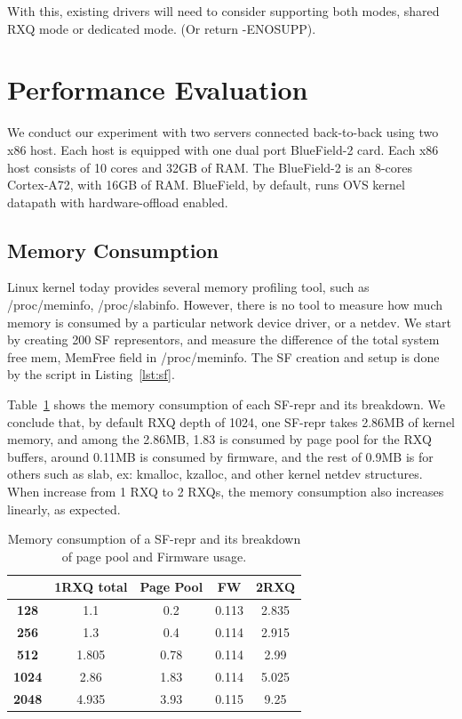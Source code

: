 \documentclass[letterpaper]{article}
\begin{document}
With this, existing drivers will need to consider supporting both
modes, shared RXQ mode or dedicated mode. (Or return -ENOSUPP).

\section{Performance Evaluation}
We conduct our experiment with two servers connected back-to-back using
two x86 host. Each host is equipped with one dual port BlueField-2 card.
Each x86 host consists of 10 cores and 32GB of RAM. The BlueField-2
is an 8-cores Cortex-A72, with 16GB of RAM. BlueField, by default, runs OVS kernel
datapath with hardware-offload enabled.

\subsection{Memory Consumption}
Linux kernel today provides several memory profiling tool, such as /proc/meminfo,
/proc/slabinfo. However, there is no tool to measure how much memory is consumed
by a particular network device driver, or a netdev. We start by creating 200 SF representors,
and measure the difference of the total system free mem, MemFree field in /proc/meminfo.
The SF creation and setup is done by the script in Listing~\ref{lst:sf}.

Table~\ref{tab:memory} shows the memory consumption of each SF-repr and its breakdown.
We conclude that, by default RXQ depth of 1024, one SF-repr takes 2.86MB of kernel
memory, and among the 2.86MB, 1.83 is consumed by page pool for the RXQ buffers,
around 0.11MB is consumed by firmware, and the rest of 0.9MB is for others
such as slab, ex: kmalloc, kzalloc, and other kernel netdev structures.
When increase from 1 RXQ to 2 RXQs, the memory consumption also increases linearly, as expected.

\begin{table}[h!]
\centering
\footnotesize

\begin{tabular}{|c|c|c|c|c|}
\hline
\textbf{} & \textbf{1RXQ total} & \textbf{Page Pool} & \textbf{FW} & \textbf{2RXQ} \\ \hline \hline
\textbf{128}  & 1.1   & 0.2  & 0.113 & 2.835 \\ \hline
\textbf{256}  & 1.3   & 0.4  & 0.114 & 2.915 \\ \hline
\textbf{512}  & 1.805 & 0.78 & 0.114 & 2.99  \\ \hline
\textbf{1024} & 2.86  & 1.83 & 0.114 & 5.025 \\ \hline
\textbf{2048} & 4.935 & 3.93 & 0.115 & 9.25  \\ \hline
\end{tabular}
\caption{Memory consumption of a SF-repr and its breakdown of page pool and Firmware usage.}
\label{tab:memory}
\end{table}
\end{document}
